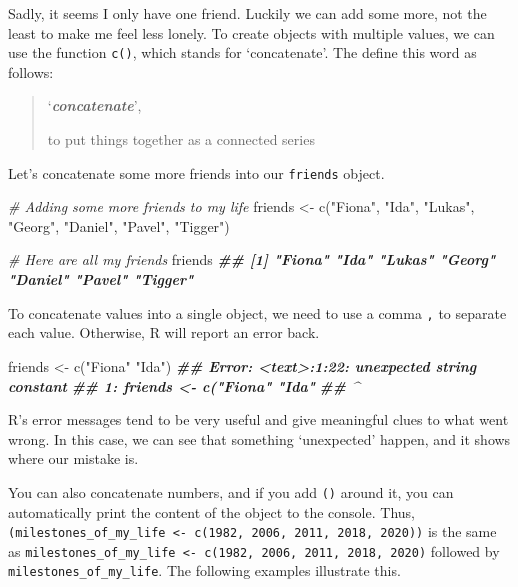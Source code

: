 \documentclass[
]{book}
\newenvironment{Shaded}{\begin{snugshade}}{\end{snugshade}}
\newcommand{\CommentTok}[1]{\textcolor[rgb]{0.56,0.35,0.01}{\textit{#1}}}
\newcommand{\DocumentationTok}[1]{\textcolor[rgb]{0.56,0.35,0.01}{\textbf{\textit{#1}}}}
\newcommand{\FunctionTok}[1]{\textcolor[rgb]{0.00,0.00,0.00}{#1}}
\newcommand{\NormalTok}[1]{#1}
\newcommand{\OtherTok}[1]{\textcolor[rgb]{0.56,0.35,0.01}{#1}}
\newcommand{\StringTok}[1]{\textcolor[rgb]{0.31,0.60,0.02}{#1}}
\begin{document}
Sadly, it seems I only have one friend. Luckily we can add some more, not the least to make me feel less lonely. To create objects with multiple values, we can use the function \texttt{c()}, which stands for `concatenate'. The \citet{concatenate-2021} define this word as follows:

\begin{quote}
`\textbf{\emph{concatenate}}',

to put things together as a connected series
\end{quote}

Let's concatenate some more friends into our \texttt{friends} object.

\begin{Shaded}
\begin{Highlighting}[]
\CommentTok{\# Adding some more friends to my life}
\NormalTok{friends }\OtherTok{\textless{}{-}} \FunctionTok{c}\NormalTok{(}\StringTok{"Fiona"}\NormalTok{, }\StringTok{"Ida"}\NormalTok{, }\StringTok{"Lukas"}\NormalTok{, }\StringTok{"Georg"}\NormalTok{, }\StringTok{"Daniel"}\NormalTok{, }\StringTok{"Pavel"}\NormalTok{, }\StringTok{"Tigger"}\NormalTok{)}

\CommentTok{\# Here are all my friends}
\NormalTok{friends}
\DocumentationTok{\#\# [1] "Fiona"  "Ida"    "Lukas"  "Georg"  "Daniel" "Pavel"  "Tigger"}
\end{Highlighting}
\end{Shaded}

To concatenate values into a single object, we need to use a comma \texttt{,} to separate each value. Otherwise, R will report an error back.

\begin{Shaded}
\begin{Highlighting}[]
\NormalTok{friends }\OtherTok{\textless{}{-}} \FunctionTok{c}\NormalTok{(}\StringTok{"Fiona"} \StringTok{"Ida"}\NormalTok{)}
\DocumentationTok{\#\# Error: \textless{}text\textgreater{}:1:22: unexpected string constant}
\DocumentationTok{\#\# 1: friends \textless{}{-} c("Fiona" "Ida"}
\DocumentationTok{\#\#                          \^{}}
\end{Highlighting}
\end{Shaded}

R's error messages tend to be very useful and give meaningful clues to what went wrong. In this case, we can see that something `unexpected' happen, and it shows where our mistake is.

You can also concatenate numbers, and if you add \texttt{()} around it, you can automatically print the content of the object to the console. Thus, \texttt{(milestones\_of\_my\_life\ \textless{}-\ c(1982,\ 2006,\ 2011,\ 2018,\ 2020))} is the same as \texttt{milestones\_of\_my\_life\ \textless{}-\ c(1982,\ 2006,\ 2011,\ 2018,\ 2020)} followed by \texttt{milestones\_of\_my\_life}. The following examples illustrate this.
\end{document}
